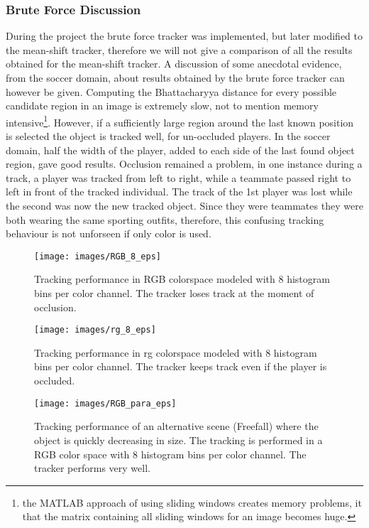 \documentclass[a4paper,11pt]{article}
\begin{document}
 

\subsubsection{Brute Force Discussion} 
During the project the brute force tracker was implemented, but later modified to the mean-shift tracker, therefore we will not give a comparison of all the results obtained for the mean-shift tracker. A discussion of some anecdotal evidence, from the soccer domain, about results obtained by the brute force tracker can however be given. Computing the Bhattacharyya distance for every possible candidate region in an image is extremely slow, not to mention memory intensive\footnote{the MATLAB approach of using sliding windows creates memory problems, it that the matrix containing all sliding windows for an image becomes huge.}. However, if a sufficiently large region around the last known position is selected the object is tracked well, for un-occluded players. In the soccer domain, half the width of the player, added to each side of the last found object region, gave good results. Occlusion remained a problem, in one instance during a track, a player was tracked from left to right, while a teammate passed right to left in front of the tracked individual. The track of the 1st player was lost while the second was now the new tracked object. Since they were teammates they were both wearing the same sporting outfits, therefore, this confusing tracking behaviour is not unforseen if only color is used.

\begin{figure}[!ht]
\label{fig:RGB_8}
\centering
\texttt{[image: images/RGB\_8\_eps]}
\caption{Tracking performance in RGB colorspace modeled with 8 histogram bins per color channel.
The tracker loses track at the moment of occlusion.}
\label{fig:rg}
\end{figure}

\begin{figure}[!ht]
\label{fig:rg_8}
\centering
\texttt{[image: images/rg\_8\_eps]}
\caption{Tracking performance in rg colorspace modeled with 8 histogram bins per color channel.
The tracker keeps track even if the player is occluded.}
\end{figure}

\begin{figure}[!ht]
\label{fig:para}
\centering
\texttt{[image: images/RGB\_para\_eps]}
\caption{Tracking performance of an alternative scene (Freefall)
where the object is quickly decreasing in size. The tracking is performed in a
RGB color space with 8 histogram bins per color channel. The tracker performs very well.}
\end{figure}
\end{document}
